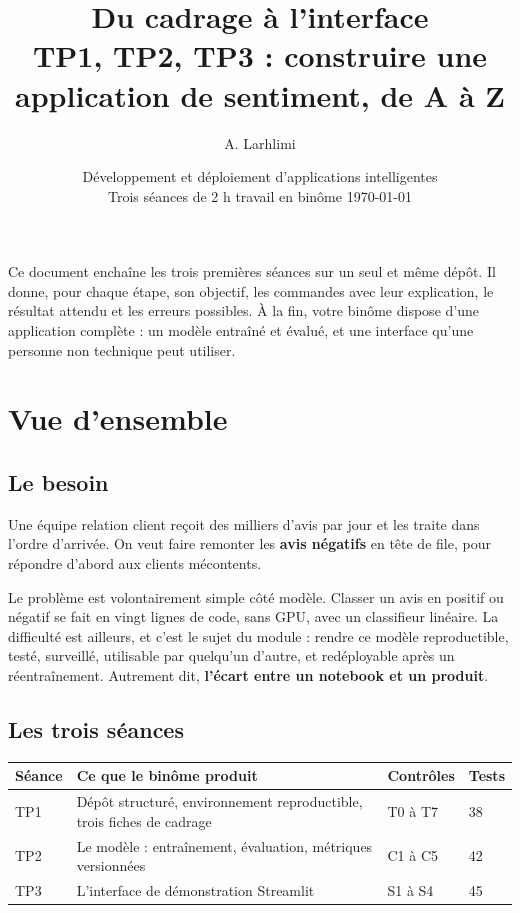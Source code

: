 \documentclass[11pt,a4paper]{article}
\title{\vspace{-1.4cm}\textbf{Du cadrage à l'interface}\\[4pt]
\large TP1, TP2, TP3 : construire une application de sentiment, de A à Z}
\author{A. Larhlimi}
\date{Développement et déploiement d'applications intelligentes\\
Trois séances de 2 h \textperiodcentered{} travail en binôme \textperiodcentered{} \today}
\begin{document}
\maketitle
\thispagestyle{fancy}

\noindent
Ce document enchaîne les trois premières séances sur un seul et même dépôt. Il donne, pour chaque
étape, son objectif, les commandes avec leur explication, le résultat attendu et les erreurs
possibles. À la fin, votre binôme dispose d'une application complète : un modèle entraîné et évalué,
et une interface qu'une personne non technique peut utiliser.

\tableofcontents
\bigskip

\section{Vue d'ensemble}

\subsection{Le besoin}

Une équipe relation client reçoit des milliers d'avis par jour et les traite dans l'ordre d'arrivée.
On veut faire remonter les \textbf{avis négatifs} en tête de file, pour répondre d'abord aux clients
mécontents.

Le problème est volontairement simple côté modèle. Classer un avis en positif ou négatif se fait en
vingt lignes de code, sans GPU, avec un classifieur linéaire. La difficulté est ailleurs, et c'est
le sujet du module : rendre ce modèle reproductible, testé, surveillé, utilisable par quelqu'un
d'autre, et redéployable après un réentraînement. Autrement dit, \textbf{l'écart entre un notebook
et un produit}.

\subsection{Les trois séances}

\begin{center}
\begin{tabular}{@{}p{1.5cm}p{8.4cm}p{2.4cm}p{2.2cm}@{}}
\toprule
\textbf{Séance} & \textbf{Ce que le binôme produit} & \textbf{Contrôles} & \textbf{Tests} \\
\midrule
TP1 & Dépôt structuré, environnement reproductible, trois fiches de cadrage & T0 à T7 & 38 \\
TP2 & Le modèle : entraînement, évaluation, métriques versionnées & C1 à C5 & 42 \\
TP3 & L'interface de démonstration Streamlit & S1 à S4 & 45 \\
\bottomrule
\end{tabular}
\end{center}
\end{document}

